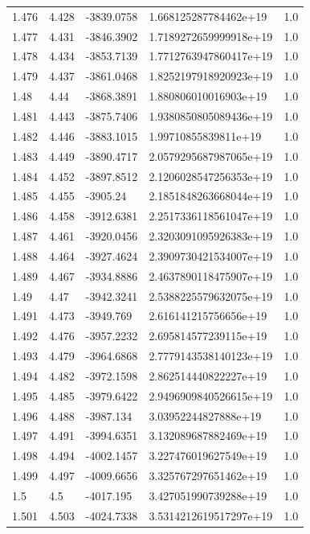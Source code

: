 \begin{tabular}{lllll}
1.476 & 4.428 & -3839.0758 & 1.668125287784462e+19 & 1.0 \\
1.477 & 4.431 & -3846.3902 & 1.7189272659999918e+19 & 1.0 \\
1.478 & 4.434 & -3853.7139 & 1.7712763947860417e+19 & 1.0 \\
1.479 & 4.437 & -3861.0468 & 1.8252197918920923e+19 & 1.0 \\
1.48 & 4.44 & -3868.3891 & 1.880806010016903e+19 & 1.0 \\
1.481 & 4.443 & -3875.7406 & 1.9380850805089436e+19 & 1.0 \\
1.482 & 4.446 & -3883.1015 & 1.99710855839811e+19 & 1.0 \\
1.483 & 4.449 & -3890.4717 & 2.0579295687987065e+19 & 1.0 \\
1.484 & 4.452 & -3897.8512 & 2.1206028547256353e+19 & 1.0 \\
1.485 & 4.455 & -3905.24 & 2.1851848263668044e+19 & 1.0 \\
1.486 & 4.458 & -3912.6381 & 2.2517336118561047e+19 & 1.0 \\
1.487 & 4.461 & -3920.0456 & 2.3203091095926383e+19 & 1.0 \\
1.488 & 4.464 & -3927.4624 & 2.3909730421534007e+19 & 1.0 \\
1.489 & 4.467 & -3934.8886 & 2.4637890118475907e+19 & 1.0 \\
1.49 & 4.47 & -3942.3241 & 2.5388225579632075e+19 & 1.0 \\
1.491 & 4.473 & -3949.769 & 2.616141215756656e+19 & 1.0 \\
1.492 & 4.476 & -3957.2232 & 2.695814577239115e+19 & 1.0 \\
1.493 & 4.479 & -3964.6868 & 2.7779143538140123e+19 & 1.0 \\
1.494 & 4.482 & -3972.1598 & 2.862514440822227e+19 & 1.0 \\
1.495 & 4.485 & -3979.6422 & 2.9496909840526615e+19 & 1.0 \\
1.496 & 4.488 & -3987.134 & 3.03952244827888e+19 & 1.0 \\
1.497 & 4.491 & -3994.6351 & 3.132089687882469e+19 & 1.0 \\
1.498 & 4.494 & -4002.1457 & 3.227476019627549e+19 & 1.0 \\
1.499 & 4.497 & -4009.6656 & 3.325767297651462e+19 & 1.0 \\
1.5 & 4.5 & -4017.195 & 3.427051990739288e+19 & 1.0 \\
1.501 & 4.503 & -4024.7338 & 3.5314212619517297e+19 & 1.0 \\

\end{tabular}

